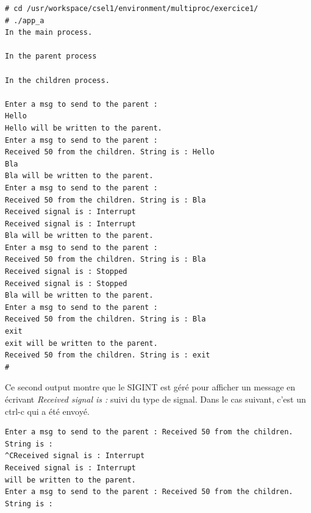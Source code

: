 \begin{lstlisting}
# cd /usr/workspace/csel1/environment/multiproc/exercice1/                      
# ./app_a                                                                       
In the main process.                                                            

In the parent process                                                           

In the children process.                                                        

Enter a msg to send to the parent :                                             
Hello                                                                           
Hello will be written to the parent.                                            
Enter a msg to send to the parent :                                             
Received 50 from the children. String is : Hello                                
Bla                                                                             
Bla will be written to the parent.                                              
Enter a msg to send to the parent :                                             
Received 50 from the children. String is : Bla                                  
Received signal is : Interrupt                                                 
Received signal is : Interrupt                                                  
Bla will be written to the parent.                                              
Enter a msg to send to the parent :                                             
Received 50 from the children. String is : Bla                                  
Received signal is : Stopped                                                    
Received signal is : Stopped                                                    
Bla will be written to the parent.                                              
Enter a msg to send to the parent :                                             
Received 50 from the children. String is : Bla                                  
exit                                                                          
exit will be written to the parent.                                             
Received 50 from the children. String is : exit 
#
\end{lstlisting}
Ce second output montre que le SIGINT est géré pour afficher un message en écrivant \textit{Received signal is :} suivi du type de signal. Dans le cas suivant, c'est un ctrl-c qui a été envoyé. 
\begin{lstlisting}
Enter a msg to send to the parent : Received 50 from the children. String is : 
^CReceived signal is : Interrupt
Received signal is : Interrupt
will be written to the parent.
Enter a msg to send to the parent : Received 50 from the children. String is : 
\end{lstlisting}

